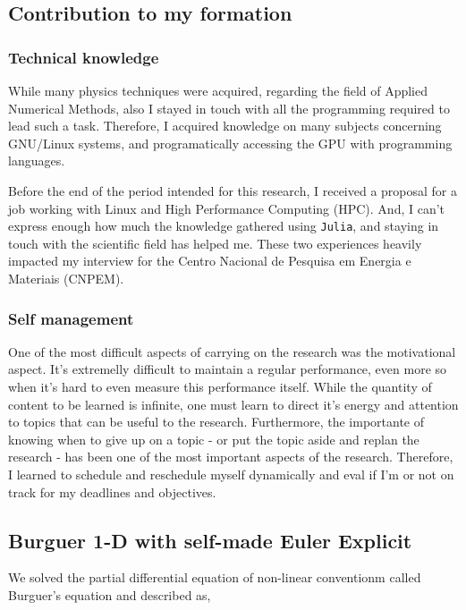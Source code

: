 \documentclass[11pt]{article}
\begin{document}
\subsection{Contribution to my formation}
\label{sec:orgb605db2}
\subsubsection{Technical knowledge}
\label{sec:orgc6eae55}
While many physics techniques were acquired, regarding the field of Applied
Numerical Methods, also I stayed in touch with all the programming required to
lead such a task. Therefore, I acquired knowledge on many subjects concerning
GNU/Linux systems, and programatically accessing the GPU with programming
languages.

Before the end of the period intended for this research, I received a proposal
for a job working with Linux and High Performance Computing (HPC). And, I can't
express enough how much the knowledge gathered using \texttt{Julia}, and staying in
touch with the scientific field has helped me. These two experiences heavily
impacted my interview for the Centro Nacional de Pesquisa em Energia e
Materiais (CNPEM).

\subsubsection{Self management}
\label{sec:org16abfc8}
One of the most difficult aspects of carrying on the research was the
motivational aspect. It's extremelly difficult to maintain a regular
performance, even more so when it's hard to even measure this performance
itself. While the quantity of content to be learned is infinite, one must learn
to direct it's energy and attention to topics that can be useful to the
research. Furthermore, the importante of knowing when to give up on a topic -  or
put the topic aside and replan the research - has been one of the most important
aspects of the research. Therefore, I learned to schedule and reschedule myself
dynamically and eval if I'm or not on track for my deadlines and objectives.

\subsection{Burguer 1-D with self-made Euler Explicit}
\label{sec:org6abadd0}

We solved the partial differential equation of non-linear conventionm
called Burguer's equation and described as,
\end{document}

